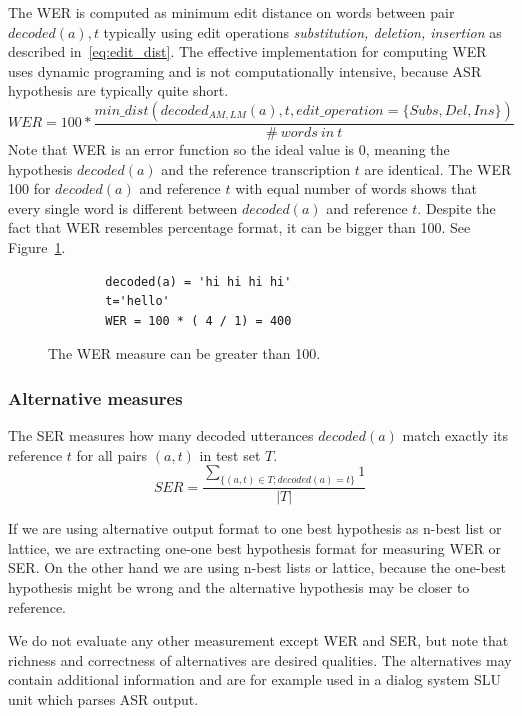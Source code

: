 {The \ac{WER} is computed as minimum edit distance on words between 
pair $decoded(a), t$ typically using edit operations {\it substitution, deletion, insertion}\/ as described in~\ref{eq:edit_dist}.
The effective implementation for computing WER uses dynamic programing and is not computationally intensive,
because \ac{ASR} hypothesis are typically quite short.\cite{TODO_WER}
\begin{equation} \label{eq:edit_dist}
    WER = 100* \frac{min\_dist(decoded_{AM, LM}(a), t, edit\_operation=\{Subs, Del, Ins\})}{\#\ words\ in\ t}
\end{equation}
Note that \ac{WER} is an error function so the ideal value is 0, meaning the hypothesis $decoded(a)$ and 
the reference transcription $t$ are identical. The \ac{WER} 100 for $decoded(a)$ and reference $t$ 
with equal number of words shows that every single word is different between $decoded(a)$ and reference $t$.
Despite the fact that \ac{WER} resembles percentage format, it can be bigger than 100. See Figure~\ref{fig:wer400}.
\begin{figure}[!htp]
    \begin{center}
    \begin{verbatim}
        decoded(a) = 'hi hi hi hi'
        t='hello'
        WER = 100 * ( 4 / 1) = 400
    \end{verbatim}
    \caption{The \acs{WER} measure can be greater than 100.}
    \label{fig:wer400} 
    \end{center}
\end{figure}

\subsubsection*{Alternative measures}
The \acl{SER} measures how many decoded utterances $decoded(a)$ match exactly its reference $t$
for all pairs $(a, t)$ in test set $T$.
\begin{equation}
    SER = \frac{\sum_{\{(a, t) \in T; decoded(a) = t\}}{1}}{|T|}
\end{equation}

If we are using alternative output format to one best hypothesis as n-best list or lattice,
we are extracting one-one best hypothesis format for measuring \ac{WER} or \ac{SER}.
On the other hand we are using n-best lists or lattice,
because the one-best hypothesis might be wrong and the alternative
hypothesis may be closer to reference.

We do not evaluate any other measurement except \ac{WER} and \ac{SER},
but note that richness and correctness of alternatives are desired qualities.
The alternatives may contain additional information and are for example used
in a dialog system \acl{SLU} unit which parses \ac{ASR} output.

}
